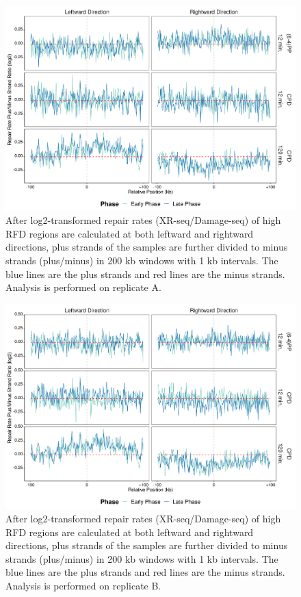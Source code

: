 \begin{figure}[H]
\begin{center}
\includegraphics[width=\textwidth]{Chapters/7_appendix/figures/supfig76}
\caption[Repair rate plus/minus ratio of high RFDs in 200 kb (replicate A).]{After log2-transformed repair rates (XR-seq/Damage-seq) of high RFD regions are calculated at both leftward and rightward directions, plus strands of the samples are further divided to minus strands (plus/minus) in 200 kb windows with 1 kb intervals. The blue lines are the plus strands and red lines are the minus strands. Analysis is performed on replicate A.}
\label{supfig:rrpm200rfdA}
\end{center}
\end{figure}

\begin{figure}[H]
\begin{center}
\includegraphics[width=\textwidth]{Chapters/7_appendix/figures/supfig77}
\caption[Repair rate plus/minus ratio of high RFDs in 200 kb (replicate B).]{After log2-transformed repair rates (XR-seq/Damage-seq) of high RFD regions are calculated at both leftward and rightward directions, plus strands of the samples are further divided to minus strands (plus/minus) in 200 kb windows with 1 kb intervals. The blue lines are the plus strands and red lines are the minus strands. Analysis is performed on replicate B.}
\label{supfig:rrpm200rfdB}
\end{center}
\end{figure}

